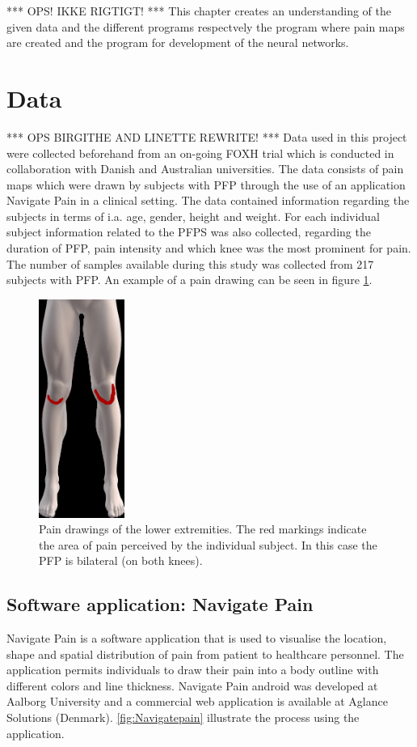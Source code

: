 *** OPS! IKKE RIGTIGT! ***
This chapter creates an understanding of the given data and the different programs respectvely the program where pain maps are created and the program for development of the neural networks. 

\section{Data}
*** OPS BIRGITHE AND LINETTE REWRITE! ***
Data used in this project were collected beforehand from an on-going FOXH trial which is conducted in collaboration with Danish and Australian universities. The data consists of pain maps which were drawn by subjects with PFP through the use of an application Navigate Pain in a clinical setting. The data contained information regarding the subjects in terms of i.a. age, gender, height and weight. For each individual subject information related to the PFPS was also collected, regarding the duration of PFP, pain intensity and which knee was the most prominent for pain. 
The number of samples available during this study was collected from 217 subjects with PFP. An example of a pain drawing can be seen in figure \ref{fig:kneepainmap}. 

\begin{figure} [H]
\centering
\includegraphics[width=0.25\textwidth]{figures/kneepainmap}
\caption{Pain drawings of the lower extremities. The red markings indicate the area of pain perceived by the individual subject. In this case the PFP is bilateral (on both knees).}
\label{fig:kneepainmap}
\end{figure}

\subsection{Software application: Navigate Pain}
Navigate Pain is a software application that is used to visualise the location, shape and spatial distribution of pain from patient to healthcare personnel. The application permits individuals to draw their pain into a body outline with different colors and line thickness. Navigate Pain android was developed at Aalborg University and a commercial web application is available at Aglance Solutions (Denmark).\citep{Solutions2015}
\autoref{fig:Navigatepain} illustrate the process using the application.

